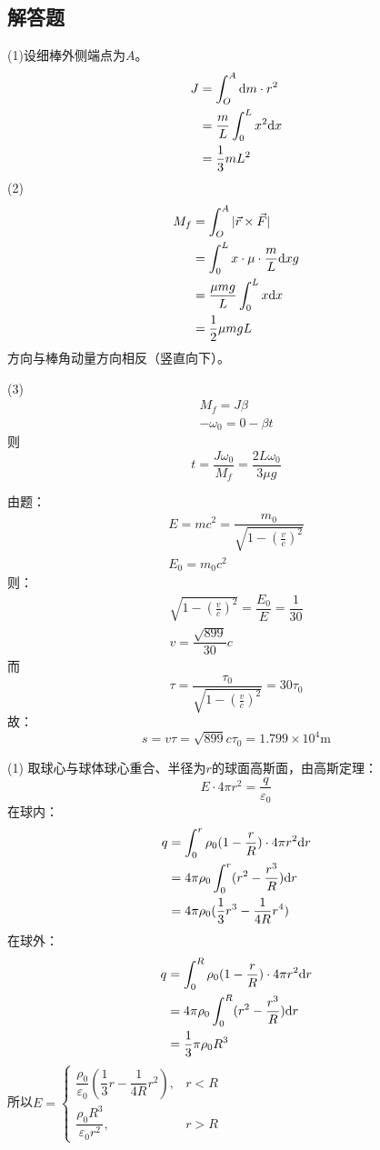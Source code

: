 \subsection{解答题}
(1)设细棒外侧端点为$A$。
\begin{align*}
	J&=\int_O^A\mathrm{d}m\cdot r^2\\
	&=\dfrac{m}{L}\int_0^Lx^2\mathrm{d}x\\
	&=\dfrac{1}{3}mL^2
\end{align*}
(2)
\begin{align*}
	M_f&=\int_O^A|\vec{r}\times\vec{F}|\\
	&=\int_0^Lx\cdot\mu\cdot\dfrac{m}{L}\mathrm{d}xg\\
	&=\dfrac{\mu mg}{L}\int_0^Lx\mathrm{d}x\\
	&=\dfrac{1}{2}\mu mgL
\end{align*}
方向与棒角动量方向相反（竖直向下）。

(3)
\begin{gather*}
	M_f=J\beta\\
	-\omega_0=0-\beta t
\end{gather*}
则
\[
	t=\dfrac{J\omega_0}{M_f}=\dfrac{2L\omega_0}{3\mu g}
\]

由题：
\begin{gather*}
	E=mc^2=\dfrac{m_0}{\sqrt{1-{(\frac{v}{c})}^2}}\\
	E_0=m_0c^2
\end{gather*}
则：
\begin{gather*}
	\sqrt{1-{(\frac{v}{c})}^2}=\dfrac{E_0}{E}=\dfrac{1}{30}\\
	v=\dfrac{\sqrt{899}}{30}c
\end{gather*}
而
\[
	\tau=\dfrac{\tau_0}{\sqrt{1-{(\frac{v}{c})}^2}}=30\tau_0
\]
故：
\[
	s=v\tau=\sqrt{899}c\tau_0=1.799\times 10^4\textrm{m}
\]

(1) 取球心与球体球心重合、半径为$r$的球面高斯面，由高斯定理：
\[
	E\cdot 4\pi r^2=\dfrac{q}{\varepsilon_0}
\]
在球内：
\begin{align*}
	q&=\int_0^r\rho_0(1-\dfrac{r}{R})\cdot 4\pi r^2\mathrm{d}r\\
	&=4\pi\rho_0\int_0^r(r^2-\dfrac{r^3}{R})\mathrm{d}r\\
	&=4\pi\rho_0(\dfrac{1}{3}r^3-\dfrac{1}{4R}r^4)
\end{align*}
在球外：
\begin{align*}
q&=\int_0^R\rho_0(1-\dfrac{r}{R})\cdot 4\pi r^2\mathrm{d}r\\
&=4\pi\rho_0\int_0^R(r^2-\dfrac{r^3}{R})\mathrm{d}r\\
&=\dfrac{1}{3}\pi\rho_0R^3
\end{align*}
所以$E=
\begin{cases}
\dfrac{\rho_0}{\varepsilon_0}(\dfrac{1}{3}r-\dfrac{1}{4R}r^2),&r<R\\
\dfrac{\rho_0R^3}{\varepsilon_0r^2},&r>R
\end{cases}$

